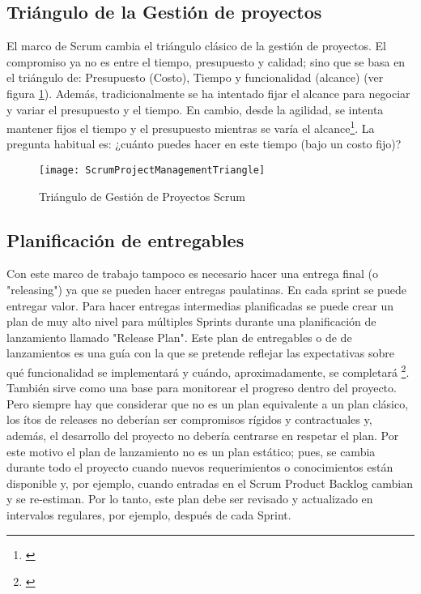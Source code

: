 \subsection{Triángulo de la Gestión de proyectos}

El marco de Scrum cambia el triángulo clásico de la gestión de proyectos. El compromiso ya no es entre el tiempo, presupuesto y calidad; sino que se basa en el triángulo de: Presupuesto (Costo), Tiempo y funcionalidad (alcance) (ver figura \ref{fig:ScrumProjectManagementTriangle}). Además, tradicionalmente se ha intentado fijar el alcance para negociar y variar el presupuesto y el tiempo. En cambio, desde la agilidad, se intenta mantener fijos el tiempo y el presupuesto mientras se varía el alcance\footnote{\cite{Martin-Alaimo-2014}}. La pregunta habitual es: ¿cuánto puedes hacer en este tiempo (bajo un costo fijo)?

\begin{figure}[h]
  \centering
  \texttt{[image: ScrumProjectManagementTriangle]}
  \caption{Triángulo de Gestión de Proyectos Scrum}
  \centering
  \label{fig:ScrumProjectManagementTriangle} %
\end{figure}

\subsection{Planificación de entregables}

Con este marco de trabajo tampoco es necesario hacer una entrega final (o "releasing") ya que se pueden hacer entregas paulatinas. En cada sprint se puede entregar valor. Para hacer entregas intermedias planificadas se puede crear un plan de muy alto nivel para múltiples Sprints durante una planificación de lanzamiento llamado "Release Plan". Este plan de entregables o de de lanzamientos es una guía con la que se pretende reflejar las expectativas sobre qué funcionalidad se implementará y cuándo, aproximadamente, se completará \footnote{\cite{Scrum-Institute-2015}}. También sirve como una base para monitorear el progreso dentro del proyecto. Pero siempre hay que considerar que no es un plan equivalente a un plan clásico, los ítos de releases no deberían ser compromisos rígidos y contractuales y, además, el desarrollo del proyecto no debería centrarse en respetar el plan. Por este motivo el plan de lanzamiento no es un plan estático; pues, se cambia durante todo el proyecto cuando nuevos requerimientos o conocimientos están disponible y, por ejemplo, cuando entradas en el Scrum Product Backlog cambian y se re-estiman. Por lo tanto, este plan debe ser revisado y actualizado en intervalos regulares, por ejemplo, después de cada Sprint.

